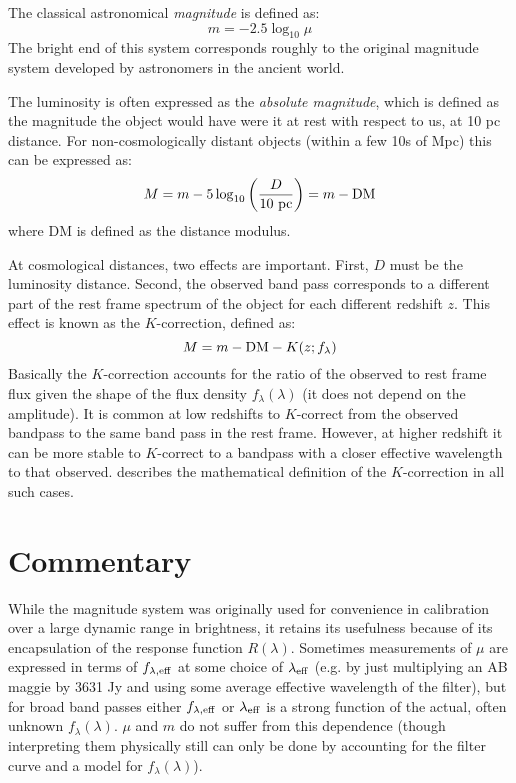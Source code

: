 The classical astronomical {\it magnitude} is defined as:
\begin{equation}
m = -2.5 \log_{10} \mu
\end{equation}
The bright end of this system corresponds roughly to the original
magnitude system developed by astronomers in the ancient world.

The luminosity is often expressed as the {\it absolute magnitude},
which is defined as the magnitude the object would have were it at
rest with respect to us, at 10 pc distance. For non-cosmologically
distant objects (within a few 10s of Mpc) this can be expressed as:
\begin{equation}
M = m - 5 \log_{10} \left(\frac{D}{10 {\rm ~pc}}\right) = m - {\rm DM}
\end{equation}
where DM is defined as the distance modulus. 

At cosmological distances, two effects are important. First, $D$ must
be the luminosity distance. Second, the observed band pass corresponds
to a different part of the rest frame spectrum of the object for each
different redshift $z$. This effect is known as the $K$-correction,
defined as:
\begin{equation}
M = m - {\rm DM} - K(z; f_\lambda)
\end{equation}
Basically the $K$-correction accounts for the ratio of the observed to
rest frame flux given the shape of the flux density
$f_\lambda(\lambda)$ (it does not depend on the amplitude). It is
common at low redshifts to $K$-correct from the observed bandpass to
the same band pass in the rest frame. However, at higher redshift it
can be more stable to $K$-correct to a bandpass with a closer
effective wavelength to that observed. \citet{hogg02c} describes the
mathematical definition of the $K$-correction in all such cases. 

\section{Commentary}

While the magnitude system was originally used for convenience in
calibration over a large dynamic range in brightness, it retains its
usefulness because of its encapsulation of the response function
$R(\lambda)$.  Sometimes measurements of $\mu$ are expressed in terms
of $f_{\lambda, {\rm eff}}$ at some choice of $\lambda_{\rm eff}$
(e.g. by just multiplying an AB maggie by 3631 Jy and using some
average effective wavelength of the filter), but for broad band passes
either $f_{\lambda, {\rm eff}}$ or $\lambda_{\rm eff}$ is a strong
function of the actual, often unknown $f_\lambda(\lambda)$. $\mu$ and
$m$ do not suffer from this dependence (though interpreting them
physically still can only be done by accounting for the filter curve
and a model for $f_\lambda(\lambda)$).

